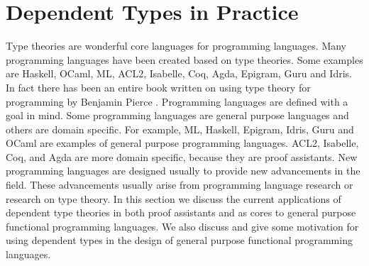 \chapter{Dependent Types in Practice}
\label{chap:the_design_of_programming_languages}
Type theories are wonderful core languages for programming languages.
Many programming languages have been created based on type
theories. Some examples are Haskell, OCaml, ML, ACL2, Isabelle, Coq,
Agda, Epigram, Guru and Idris.  In fact there has been an entire book
written on using type theory for programming by Benjamin Pierce
\cite{Pierce:2002}.  Programming languages are defined with a goal in
mind.  Some programming languages are general purpose languages and
others are domain specific.  For example, ML, Haskell, Epigram, Idris,
Guru and OCaml are examples of general purpose programming
languages. ACL2, Isabelle, Coq, and Agda are more domain specific,
because they are proof assistants. New programming languages are
designed usually to provide new advancements in the field.  These
advancements usually arise from programming language research or
research on type theory.  In this section we discuss the current
applications of dependent type theories in both proof assistants and
as cores to general purpose functional programming languages.  We also
discuss and give some motivation for using dependent types in the
design of general purpose functional programming languages.

